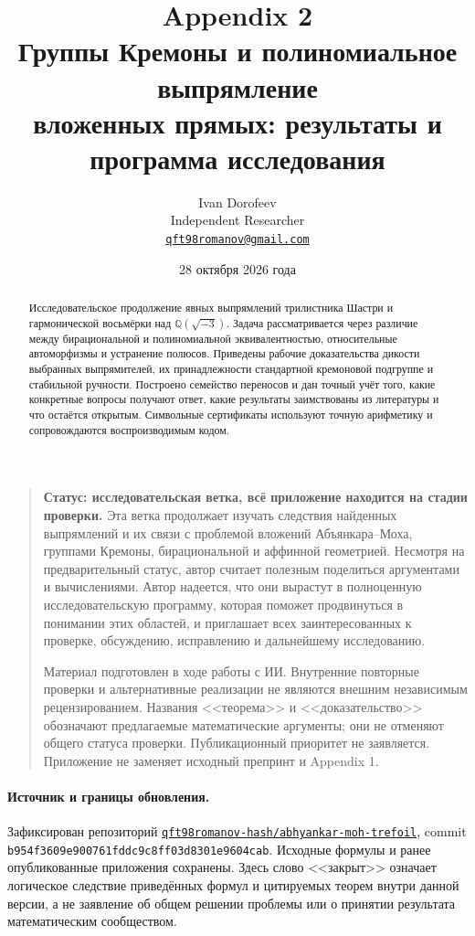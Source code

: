 \documentclass[11pt,a4paper]{article}
\title{\vspace{-12mm}\LARGE\bfseries Appendix 2\\[4pt]
 Группы Кремоны и полиномиальное выпрямление\\
 вложенных прямых: результаты и программа исследования}
\author{Ivan Dorofeev\\[3pt]\normalsize Independent Researcher\\
 \normalsize\href{mailto:qft98romanov@gmail.com}{\texttt{qft98romanov@gmail.com}}}
\date{28 октября 2026 года}
\theoremstyle{definition}
\theoremstyle{remark}
\newcommand{\Q}{{\mathbb Q}}
\begin{document}
\maketitle
\begin{abstract}
Исследовательское продолжение явных выпрямлений трилистника Шастри и
гармонической восьмёрки над $\Q(\sqrt{-3})$. Задача рассматривается через
различие между бирациональной и полиномиальной эквивалентностью, относительные
автоморфизмы и устранение полюсов. Приведены рабочие доказательства дикости
выбранных выпрямителей, их принадлежности стандартной кремоновой подгруппе
и стабильной ручности. Построено семейство переносов и дан точный учёт
того, какие конкретные вопросы получают ответ, какие результаты заимствованы
из литературы и что остаётся открытым. Символьные сертификаты используют
точную арифметику и сопровождаются воспроизводимым кодом.
\end{abstract}

\begin{quote}\small
\textbf{Статус: исследовательская ветка, всё приложение находится на стадии проверки.}
Эта ветка продолжает изучать следствия найденных выпрямлений и их связи
с проблемой вложений Абъянкара--Моха, группами Кремоны, бирациональной
и аффинной геометрией. Несмотря на предварительный статус, автор считает
полезным поделиться аргументами и вычислениями. Автор надеется, что они
вырастут в полноценную исследовательскую программу, которая поможет
продвинуться в понимании этих областей, и приглашает всех заинтересованных
к проверке, обсуждению, исправлению и дальнейшему исследованию.

Материал подготовлен в ходе работы с ИИ. Внутренние повторные проверки и
альтернативные реализации не являются внешним независимым рецензированием.
Названия <<теорема>> и <<доказательство>> обозначают предлагаемые математические
аргументы; они не отменяют общего статуса проверки. Публикационный приоритет
не заявляется. Приложение не заменяет исходный препринт и Appendix 1.
\end{quote}

\paragraph{Источник и границы обновления.}
Зафиксирован репозиторий
\href{https://github.com/qft98romanov-hash/abhyankar-moh-trefoil/tree/b954f3609e900761fddc9c8ff03d8301e9604cab}{\nolinkurl{qft98romanov-hash/abhyankar-moh-trefoil}},
commit \nolinkurl{b954f3609e900761fddc9c8ff03d8301e9604cab}.
Исходные формулы и ранее опубликованные приложения сохранены.
Здесь слово <<закрыт>> означает логическое следствие приведённых формул
и цитируемых теорем внутри данной версии, а не заявление об общем решении
проблемы или о принятии результата математическим сообществом.

\tableofcontents






\end{document}
